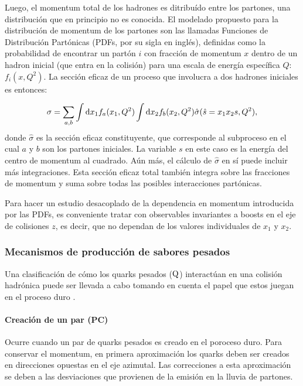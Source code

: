 \documentclass[a4paper,12pt]{article}
\begin{document}
Luego, el momentum total de los hadrones es ditribuído entre los partones, una distribución que en principio no es conocida. El modelado propuesto para la distribución de momentum de los partones son las llamadas Funciones de Distribución Partónicas (PDFs, por su sigla en inglés), definidas como la probabilidad de encontrar un partón $i$ con fracción de momentum $x$ dentro de un hadron inicial (que entra en la colisión) para una escala de energía específica $Q$: $f_i(x,Q^2)$. La sección eficaz de un proceso que involucra a dos hadrones iniciales es entonces:

\begin{equation}
\sigma = \sum_{a,b} \int {\mathrm d} x_1 f_a(x_1,Q^2) \int {\mathrm d} x_2 f_b(x_2,Q^2) \hat{\sigma} (\hat{s}=x_1x_2s,Q^2), 
\end{equation}
donde $\hat{\sigma}$ es la sección eficaz constituyente, que corresponde al subproceso en el cual $a$ y $b$ son los partones iniciales. La variable $s$ en este caso es la energía del centro de momentum al cuadrado. Aún más, el cálculo de $\hat{\sigma}$ en sí puede incluir más integraciones. Esta sección eficaz total también integra sobre las fracciones de momentum y suma sobre todas las posibles interacciones partónicas.

Para hacer un estudio desacoplado de la dependencia en momentum introducida por las PDFs, es conveniente tratar con observables invariantes a boosts en el eje de colisiones $z$, es decir, que no dependan de los valores individuales de $x_1$ y $x_2$.

\subsubsection{Mecanismos de producción de sabores pesados}

Una clasificación de cómo los quarks pesados (${\mathrm Q}$) interactúan en una colisión hadrónica puede ser llevada a cabo tomando en cuenta el papel que estos juegan en el proceso duro \cite{Norrbin:2000zc}.

\paragraph{Creación de un par (PC)} Ocurre cuando un par de quarks pesados es creado en el poroceso duro. Para conservar el momentum, en primera aproximación los quarks deben ser creados en direcciones opuestas en el eje azimutal. Las correcciones a esta aproximación se deben a las desviaciones que provienen de la emisión en la lluvia de partones.
\end{document}
